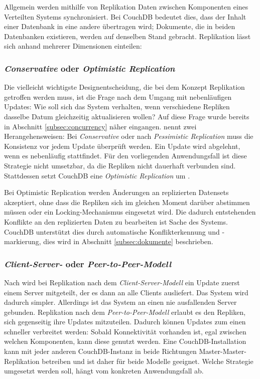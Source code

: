 Allgemein werden mithilfe von Replikation Daten zwischen Komponenten eines Verteilten Systems synchronisiert. Bei CouchDB bedeutet dies, dass der Inhalt einer Datenbank in eine andere übertragen wird; Dokumente, die in beiden Datenbanken existieren, werden auf denselben Stand gebracht. Replikation lässt sich anhand mehrerer Dimensionen einteilen:


\subsubsection{\textit{Conservative} oder \textit{Optimistic Replication}}
\label{subsec:optimistic}

Die vielleicht wichtigste Designentscheidung, die bei dem Konzept Replikation getroffen werden muss, ist die Frage nach dem Umgang mit nebenläufigen Updates: Wie soll sich das System verhalten, wenn verschiedene Repliken dasselbe Datum gleichzeitig aktualisieren wollen? Auf diese Frage wurde bereits in Abschnitt \ref{subsec:concurrency} näher eingangen.  nennt zwei Herangehensweisen: Bei \textit{Conservative} oder nach  \textit{Pessimistic Replication} muss die Konsistenz vor jedem Update überprüft werden. Ein Update wird abgelehnt, wenn es nebenläufig stattfindet. Für den vorliegenden Anwendungsfall ist diese Strategie nicht umsetzbar, da die Repliken nicht dauerhaft verbunden sind. Stattdessen setzt CouchDB eine \textit{Optimistic Replication} um . 

Bei Optimistic Replication werden Änderungen an replizierten Datensets akzeptiert, ohne dass die Repliken sich im gleichen Moment darüber abstimmen müssen oder ein Locking-Mechanismus eingesetzt wird. Die dadurch entstehenden Konflikte an den replizierten Daten zu bearbeiten ist Sache des Systems. CouchDB unterstützt dies durch automatische Konflikterkennung und -markierung, dies wird in Abschnitt \ref{subsec:dokumente} beschrieben. 




\subsubsection{\textit{Client-Server-} oder \textit{Peer-to-Peer-Modell}}

Nach  wird bei Replikation nach dem \textit{Client-Server-Modell} ein Update zuerst einem Server mitgeteilt, der es dann an alle Clients ausliefert. Das System wird dadurch simpler. Allerdings ist das System an einen nie ausfallenden Server gebunden. Replikation nach dem \textit{Peer-to-Peer-Modell} erlaubt es den Repliken, sich gegenseitig ihre Updates mitzuteilen. Dadurch können Updates zum einen schneller verbreitet werden: Sobald Konnektivität vorhanden ist, egal zwischen welchen Komponenten, kann diese genutzt werden. Eine CouchDB-Installation kann mit jeder anderen CouchDB-Instanz in beide Richtungen Master-Master-Replikation betreiben und ist daher für beide Modelle geeignet. Welche Strategie umgesetzt werden soll, hängt vom konkreten Anwendungsfall ab.  


